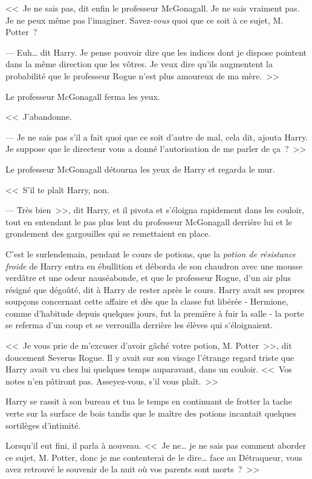 \later

<<~Je ne sais pas, dit enfin le professeur McGonagall. Je ne sais vraiment pas. Je ne peux même pas l'imaginer. Savez-\emph{vous} quoi que ce soit à ce sujet, M. Potter~?

--- Euh… dit Harry. Je pense pouvoir dire que les indices dont je dispose pointent dans la même direction que les vôtres. Je veux dire qu'ils augmentent la probabilité que le professeur Rogue n'est plus amoureux de ma mère.~>>

Le professeur McGonagall ferma les yeux.

<<~J'abandonne.

--- Je ne sais pas s'il a fait quoi que ce soit d'autre de mal, cela dit, ajouta Harry. Je suppose que le directeur vous a donné l'autorisation de me parler de ça~?~>>

Le professeur McGonagall détourna les yeux de Harry et regarda le mur.

<<~S'il te plaît Harry, non.

--- Très bien~>>, dit Harry, et il pivota et s'éloigna rapidement dans les couloir, tout en entendant le pas plus lent du professeur McGonagall derrière lui et le grondement des gargouilles qui se remettaient en place.

\later

C'est le surlendemain, pendant le cours de potions, que la \emph{potion de résistance froide} de Harry entra en ébullition et déborda de son chaudron avec une mousse verdâtre et une odeur nauséabonde, et que le professeur Rogue, d'un air plus résigné que dégoûté, dit à Harry de rester après le cours. Harry avait ses propres soupçons concernant cette affaire et dès que la classe fut libérée - Hermione, comme d'habitude depuis quelques jours, fut la première à fuir la salle - la porte se referma d'un coup et se verrouilla derrière les élèves qui s'éloignaient.

<<~Je vous prie de m'excuser d'avoir gâché votre potion, M. Potter~>>, dit doucement Severus Rogue. Il y avait sur son visage l'étrange regard triste que Harry avait vu chez lui quelques temps auparavant, dans un couloir. <<~Vos notes n'en pâtiront pas. Asseyez-vous, s'il vous plaît.~>>

Harry se rassit à son bureau et tua le temps en continuant de frotter la tache verte sur la surface de bois tandis que le maître des potions incantait quelques sortilèges d'intimité.

Lorsqu'il eut fini, il parla à nouveau. <<~Je ne… je ne sais pas comment aborder ce sujet, M. Potter, donc je me contenterai de le dire… face au Détraqueur, vous avez retrouvé le souvenir de la nuit où vos parents sont morts~?~>>

